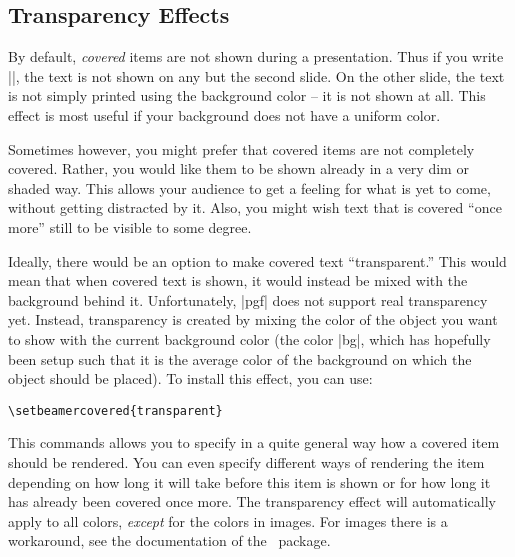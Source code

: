 \subsection{Transparency Effects}
\label{section-transparent}

By default, \emph{covered} items are not shown during a
presentation. Thus if you write ||, the text
is not shown on any but the second slide. On the other slide, the text
is not simply printed using the background color -- it is not shown at
all. This effect is most useful if your background does not have a
uniform color.

Sometimes however, you might prefer that covered items are not
completely covered. Rather, you would like them to be shown already in
a very dim or shaded way. This allows your audience to get a feeling
for what is yet to come, without getting distracted by it. Also, you
might wish text that is covered ``once more'' still to be visible to
some degree.

Ideally, there would be an option to make covered text
``transparent.'' This would mean that when covered text is shown, it
would instead be mixed with the background behind it. Unfortunately,
|pgf| does not support real transparency yet. Instead, transparency is
created by mixing the color of the object you want to show with the
current background color (the color |bg|, which has hopefully been
setup such that it is the average color of the background on which the
object should be placed). To install this effect, you can use:
\begin{verbatim}
\setbeamercovered{transparent}
\end{verbatim}
This commands allows you to specify in a quite general way how a
covered item should be rendered. You can even specify different ways
of rendering the item depending on how long it will take before this
item is shown or for how long it has already been covered once
more. The transparency effect will automatically apply to all colors,
\emph{except} for the colors in images. For images there is a
workaround, see the documentation of the \pgf\ package. 

